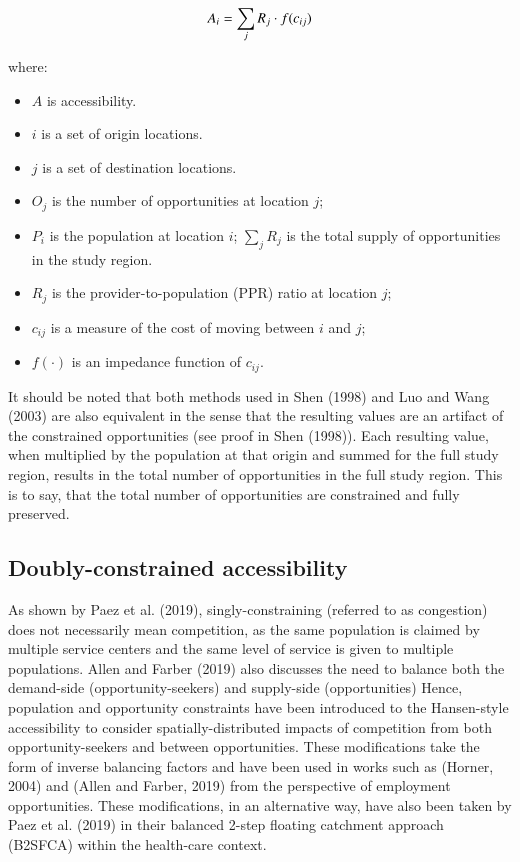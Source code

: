 \documentclass[]{elsarticle} %
\providecommand{\tightlist}{%
  \setlength{\itemsep}{0pt}\setlength{\parskip}{0pt}}
\begin{document}
\begin{equation}
\label{eq:2SFCA-step2}
A_{i} = {\sum_j R_{j} \cdot f(c_{ij})}\\
\end{equation}

\noindent where:

\begin{itemize}
\tightlist
\item
  \(A\) is accessibility.
\item
  \(i\) is a set of origin locations.
\item
  \(j\) is a set of destination locations.
\item
  \(O_j\) is the number of opportunities at location \(j\);
\item
  \(P_i\) is the population at location \(i\); \(\sum_j R_j\) is the
  total supply of opportunities in the study region.
\item
  \(R_j\) is the provider-to-population (PPR) ratio at location \(j\);
\item
  \(c_{ij}\) is a measure of the cost of moving between \(i\) and \(j\);
\item
  \(f(\cdot)\) is an impedance function of \(c_{ij}\).
\end{itemize}

It should be noted that both methods used in Shen (1998) and Luo and
Wang (2003) are also equivalent in the sense that the resulting values
are an artifact of the constrained opportunities (see proof in Shen
(1998)). Each resulting value, when multiplied by the population at that
origin and summed for the full study region, results in the total number
of opportunities in the full study region. This is to say, that the
total number of opportunities are constrained and fully preserved.

\hypertarget{doubly-constrained-accessibility}{%
\subsection{Doubly-constrained
accessibility}\label{doubly-constrained-accessibility}}

As shown by Paez et al. (2019), singly-constraining (referred to as
congestion) does not necessarily mean competition, as the same
population is claimed by multiple service centers and the same level of
service is given to multiple populations. Allen and Farber (2019) also
discusses the need to balance both the demand-side (opportunity-seekers)
and supply-side (opportunities) Hence, population and opportunity
constraints have been introduced to the Hansen-style accessibility to
consider spatially-distributed impacts of competition from both
opportunity-seekers and between opportunities. These modifications take
the form of inverse balancing factors and have been used in works such
as (Horner, 2004) and (Allen and Farber, 2019) from the perspective of
employment opportunities. These modifications, in an alternative way,
have also been taken by Paez et al. (2019) in their balanced 2-step
floating catchment approach (B2SFCA) within the health-care context.
\end{document}
